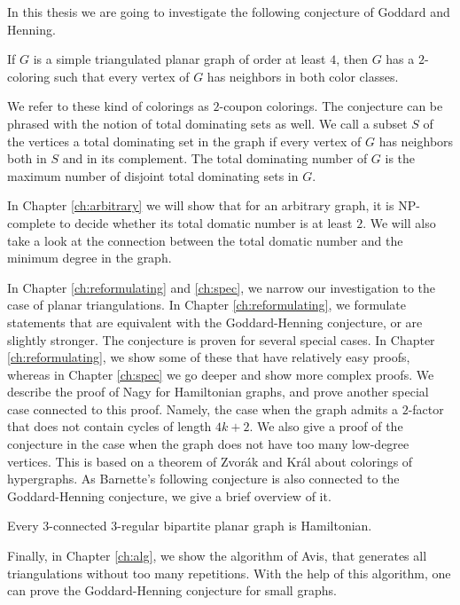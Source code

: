 In this thesis we are going to investigate the following conjecture of Goddard
and Henning.

\begin{conj*}
  If $G$ is a simple triangulated planar graph of order at least $4$, then $G$ has
  a $2$-coloring such that every vertex of $G$ has neighbors in both color classes.
\end{conj*}

We refer to these kind of colorings as $2$-coupon colorings. The conjecture can
be phrased with the notion of total dominating sets as well. We call a subset $S$ of
the vertices a total dominating set in the graph if every vertex of $G$ has neighbors both in
$S$ and in its complement. The total dominating number of $G$ is the maximum number
of disjoint total dominating sets in $G$.

In Chapter \ref{ch:arbitrary} we will show that for an arbitrary graph, it is NP-complete
to decide whether its total domatic number is at least $2$. We will also take a look
at the connection between the total domatic number and the minimum degree in the graph.

In Chapter \ref{ch:reformulating} and \ref{ch:spec}, we narrow our investigation to
the case of planar triangulations. In Chapter \ref{ch:reformulating}, we formulate
statements that are equivalent with the Goddard-Henning conjecture, or are slightly stronger.
The conjecture is proven for several special cases. In Chapter \ref{ch:reformulating}, we show
some of these that have relatively easy proofs, whereas in Chapter \ref{ch:spec} we go deeper
and show more complex proofs. We describe the proof of Nagy for Hamiltonian graphs,
and prove another special case connected to this proof. Namely, the case when the graph admits
a $2$-factor that does not contain cycles of length $4k +2$. We also give a proof of
the conjecture in the case when the graph does not have too many low-degree vertices.
This is based on a theorem of Zvorák and Král about colorings of hypergraphs.
As Barnette's following conjecture is also connected to the Goddard-Henning conjecture,
we give a brief overview of it.

\begin{conj*}
  Every $3$-connected $3$-regular bipartite planar graph is Hamiltonian.
\end{conj*}

Finally, in Chapter \ref{ch:alg}, we show the algorithm of Avis, that generates all
triangulations without too many repetitions. With the help of this algorithm, one
can prove the Goddard-Henning conjecture for small graphs.
